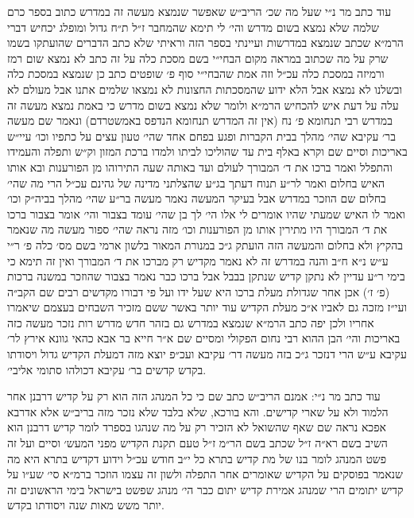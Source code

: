 \documentclass[12pt, openany]{book}
\begin{document}
\begin{multicols}{2}
עוד כתב מר נ״י שעל מה שכ׳ הריב״ש שאפשר שנמצא מעשה זה במדרש כתוב בספר כרם שלמה שלא נמצא בשום מדרש והי׳ לי תימא שהמחבר ז״ל ת״ח גדול ומופלג יכחיש דברי הרמ״א שכתב שנמצא במדרשות ועיינתי בספר הזה וראיתי שלא כתב הדברים שהועתקו בשמו שרק על מה שכתוב במראה מקום הבחי״י בשם מסכת כלה על זה כתב לא נמצא שום רמז ורמיזה במסכת כלה עכ״ל וזה אמת שהבחי״י סוף פ׳ שופטים כתב כן שנמצא במסכת כלה ובשלנו לא נמצא אבל הלא ידוע שהמסכתות החצונות לא נמצאו שלמים אתנו אבל מעולם לא עלה על דעת איש להכחיש הרמ״א ולומר שלא נמצא בשום מדרש כי באמת נמצא מעשה זה במדרש רבי תנחומא פ׳ נח (אין זה המדרש תנחומא הנדפס באמשטרדם) ונאמר שם מעשה בר׳ עקיבא שהי׳ מהלך בבית הקברות ופגע בפחם אחד שהי׳ טעון עצים על כתפיו וכו׳ עיי״ש באריכות וסיים שם וקרא באלף בית עד שהוליכו לביתו ולמדו ברכת המזון וק״ש ותפלה והעמידו והתפלל ואמר ברכו את ד׳ המבורך לעולם ועד באותה שעה התירוהו מן הפורענות ובא אותו האיש בחלום ואמר לר״ע תנוח דעתך בג״ע שהצלתני מדינה של גהינם עכ״ל הרי מה שהי׳ בחלום שם הוזכר במדרש אבל בעיקר המעשה נאמר מעשה בר״ע שהי׳ מהלך בביה״ק וכו׳ ואמר לו האיש שמעתי שהיו אומרים לי אלו הי׳ לך בן שהי׳ עומד בצבור והי׳ אומר בצבור ברכו את ד׳ המבורך היו מתירין אותו מן הפורענות וכו׳ מזה נראה שהי׳ ספור מעשה מה שנאמר בהקיץ ולא בחלום והמעשה הזה הועתק ג״כ במנורת המאור בלשון ארמי בשם מס׳ כלה פ׳ ר״י ע״ש נ״א ח״ב והנה במדרש זה לא נאמר מקדיש רק מברכו את ד׳ המבורך ואין זה תימא כי בימי ר״ע עדיין לא נתקן קדיש שנתקן בבבל אבל ברכו כבר נאמר בצבור שהוזכר במשנה ברכות (פ׳ ז׳) אכן אחר שגדולת מעלת ברכו היא שעל ידו ועל פי דבורו מקדשים רבים שם הקב״ה ועי״ז מזכה גם לאביו א״כ מעלת הקדיש עוד יותר באשר ששם מזכיר השבחים בעצמם שיאמרו אחריו ולכן יפה כתב הרמ״א שנמצא במדרש גם בזהר חדש מדרש רות נזכר מעשה כזה באריכות והי׳ הבן ההוא רבי נחום הפקולי ומסיים שם א״ר חייא בר אבא כהאי גוונא אירץ לר׳ עקיבא ע״ש הרי דנזכר ג״כ בזה מעשה דר׳ עקיבא ועכ״פ יוצא מזה דמעלת הקדיש גדול ויסודתו בקדש קדשים בר׳ עקיבא דכולהו סתומי אליבי׳.\\\vspace{0pt}

עוד כתב מר נ״י: אמנם הריב״ש כתב שם כי כל המנהג הזה הוא רק על קדיש דרבנן אחר הלמוד ולא על שארי קדישים. והא בורכא, שלא בלבד שלא נזכר מזה בריב״ש אלא אדרבא אפכא נראה שם שאף שהשואל לא הזכיר רק על מה שנהגו בספרד לומר קדיש דרבנן הוא השיב בשם רא״ה ז״ל שכתב בשם הר״מ ז״ל טעם תקנת הקדיש מפני המעש׳ וסיים ועל זה פשט המנהג לומר בנו של מת קדיש בתרא כל י״ב חודש עכ״ל וידוע דקדיש בתרא היא מה שנאמר בפוסקים על הקדיש שאומרים אחר התפלה ולשון זה עצמו הוזכר ברמ״א סי׳ שע״ו על קדיש יתומים הרי שמנהג אמירת קדיש יתום כבר הי׳ מנהג שפשט בישראל בימי הראשונים זה יותר משש מאות שנה ויסודתו בקדש.\\\vspace{0pt}


\end{multicols}
\end{document}
